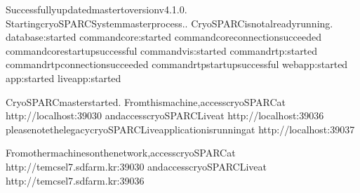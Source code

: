 \documentclass[a4paper,11pt,english]{sphinxmanual}
\begin{document}
\begin{sphinxVerbatim}[commandchars=\\\{\}]
Successfullyupdatedmastertoversionv4.1.0.
\PYGZhy{}\PYGZhy{}\PYGZhy{}
StartingcryoSPARCSystemmasterprocess..
CryoSPARCisnotalreadyrunning.
database:started
command\PYGZus{}core:started
command\PYGZus{}coreconnectionsucceeded
command\PYGZus{}corestartupsuccessful
command\PYGZus{}vis:started
command\PYGZus{}rtp:started
command\PYGZus{}rtpconnectionsucceeded
command\PYGZus{}rtpstartupsuccessful
webapp:started
app:started
liveapp:started
\PYGZhy{}\PYGZhy{}\PYGZhy{}\PYGZhy{}\PYGZhy{}\PYGZhy{}\PYGZhy{}\PYGZhy{}\PYGZhy{}\PYGZhy{}\PYGZhy{}\PYGZhy{}\PYGZhy{}\PYGZhy{}\PYGZhy{}\PYGZhy{}\PYGZhy{}\PYGZhy{}\PYGZhy{}\PYGZhy{}\PYGZhy{}\PYGZhy{}\PYGZhy{}\PYGZhy{}\PYGZhy{}\PYGZhy{}\PYGZhy{}\PYGZhy{}\PYGZhy{}\PYGZhy{}\PYGZhy{}\PYGZhy{}\PYGZhy{}\PYGZhy{}\PYGZhy{}\PYGZhy{}\PYGZhy{}\PYGZhy{}\PYGZhy{}\PYGZhy{}\PYGZhy{}\PYGZhy{}\PYGZhy{}\PYGZhy{}\PYGZhy{}\PYGZhy{}\PYGZhy{}\PYGZhy{}\PYGZhy{}\PYGZhy{}\PYGZhy{}\PYGZhy{}\PYGZhy{}

CryoSPARCmasterstarted.
Fromthismachine,accesscryoSPARCat
http://localhost:39030
andaccesscryoSPARCLiveat
http://localhost:39036
pleasenotethelegacycryoSPARCLiveapplicationisrunningat
http://localhost:39037

Fromothermachinesonthenetwork,accesscryoSPARCat
http://tem\PYGZhy{}cs\PYGZhy{}el7.sdfarm.kr:39030
andaccesscryoSPARCLiveat
http://tem\PYGZhy{}cs\PYGZhy{}el7.sdfarm.kr:39036



\end{sphinxVerbatim}
\end{document}
